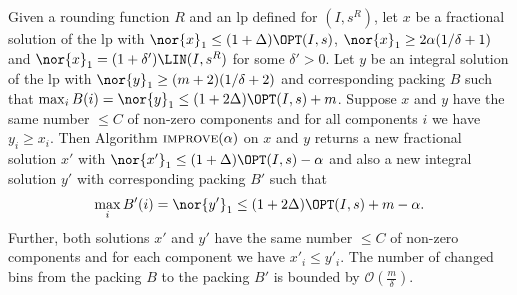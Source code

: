 \begin{theorem}\label{thm-packing}
    Given a rounding function $R$ and an \ac{lp} defined for $(I,s^{R})$, let $x$ be a fractional solution of the \ac{lp} with
	$\nor{x}_1 \leq (1+ \Delta) \OPT(I,s)$, $\nor{x}_1 \geq 2\alpha(1/\delta +1)$ and $\nor{x}_1 = (1+\delta')\LIN(I,s^{R})$ for some $\delta'>0$. Let $y$ be an integral solution of the \ac{lp} with $\nor{y}_1 \geq (m+2)(1/\delta +2)$ and corresponding packing $B$ such that $\max_i B (i) = \nor{y}_1 \leq (1+ 2\Delta) \OPT(I,s)+m$.
	Suppose $x$ and $y$ have the same number $\leq C$ of non-zero components and for all components $i$ we have
	$y_i \geq x_i$.	Then Algorithm $\textsc{improve}(\alpha)$ on $x$ and $y$ returns a new fractional solution $x'$ with $\nor{x'}_1 \leq (1+ \Delta) 
	\OPT(I,s) - \alpha$ and also a new integral solution $y'$ with corresponding packing $B'$ such that
	\begin{align*}
    \max_i B' (i) =\nor{y'}_1 \leq (1+ 2 \Delta) \OPT(I,s) +m- \alpha.
    \end{align*}
	Further, both solutions $x'$ and $y'$ have the same number $\leq C$ of non-zero components and for each component we have
	$x'_i \leq y'_i$. The number of changed bins from the packing
        $B$ to the packing $B'$ is bounded by $\mathcal{O}(\frac{m}{\delta})$.
    \end{theorem}
